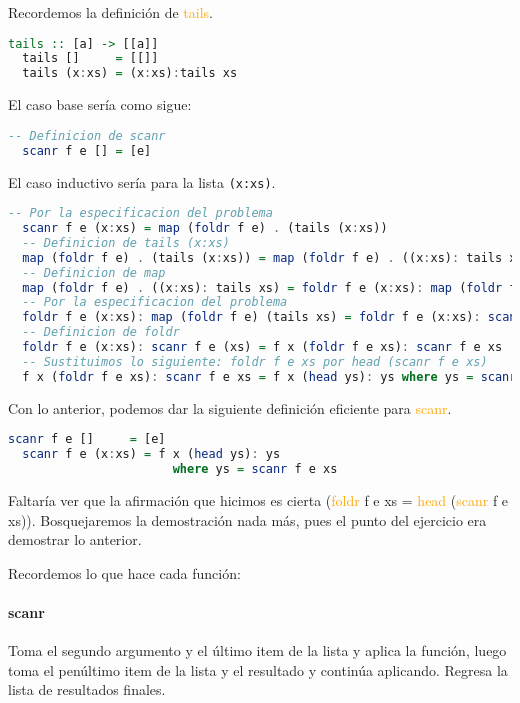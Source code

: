 \documentclass[spanish,12pt,letterpaper]{article}
\begin{document}
Recordemos la definición de \textcolor{orange}{tails}.

\begin{lstlisting}[language=Haskell]
  tails :: [a] -> [[a]]
  tails []     = [[]]
  tails (x:xs) = (x:xs):tails xs
\end{lstlisting}

El caso base sería como sigue:

\begin{lstlisting}[language=Haskell]
  -- Definicion de scanr
  scanr f e [] = [e]
\end{lstlisting}

El caso inductivo sería para la lista \texttt{(x:xs)}.

\begin{lstlisting}[language=Haskell]
  -- Por la especificacion del problema
  scanr f e (x:xs) = map (foldr f e) . (tails (x:xs))
  -- Definicion de tails (x:xs)
  map (foldr f e) . (tails (x:xs)) = map (foldr f e) . ((x:xs): tails xs)
  -- Definicion de map
  map (foldr f e) . ((x:xs): tails xs) = foldr f e (x:xs): map (foldr f e) (tails xs)
  -- Por la especificacion del problema
  foldr f e (x:xs): map (foldr f e) (tails xs) = foldr f e (x:xs): scanr f e (xs)
  -- Definicion de foldr
  foldr f e (x:xs): scanr f e (xs) = f x (foldr f e xs): scanr f e xs
  -- Sustituimos lo siguiente: foldr f e xs por head (scanr f e xs)
  f x (foldr f e xs): scanr f e xs = f x (head ys): ys where ys = scanr f e xs
\end{lstlisting}

Con lo anterior, podemos dar la siguiente definición eficiente para
\textcolor{orange}{scanr}.

\begin{lstlisting}[language=Haskell]
  scanr f e []     = [e]
  scanr f e (x:xs) = f x (head ys): ys
                       where ys = scanr f e xs
\end{lstlisting}

Faltaría ver que la afirmación que hicimos es cierta
(\textcolor{orange}{foldr} f e xs =  \textcolor{orange}{head}
(\textcolor{orange}{scanr} f e xs)). Bosquejaremos la demostración nada más, pues
el punto del ejercicio era demostrar lo anterior.

Recordemos lo que hace cada función:

\paragraph{scanr} Toma el segundo argumento y el último item de la lista y aplica
la función, luego toma el penúltimo item de la lista y el resultado y continúa
aplicando. Regresa la lista de resultados finales.
\end{document}
